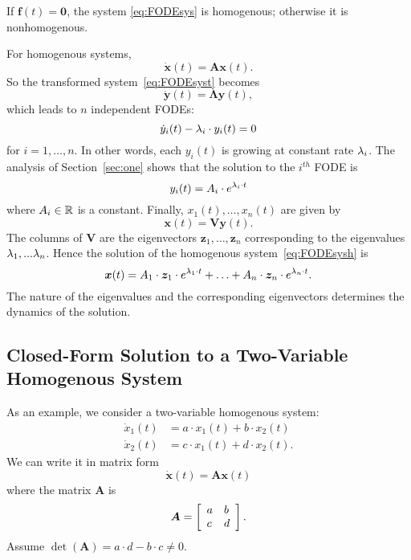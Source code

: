 \documentclass[letterpaper,12pt,leqno]{article}
\begin{document}
If $\bm{f}(t) =\bm{0}$, the system \eqref{eq:FODEsys} is homogenous; otherwise it is nonhomogenous. 

For homogenous systems, 
\begin{equation}
\bm{\dot{x}}(t) =\bm{A} \bm{x}(t).\label{eq:FODEsysh}
\end{equation}
So the transformed system~\eqref{eq:FODEsyst} becomes 
\begin{equation*}
\bm{\dot{y}}(t) =\bm{\Lambda}\bm{y}(t) ,
\end{equation*}
which leads to $n$ independent FODEs:
\begin{equation*}
\dot{y}_{i}(t) -\lambda_{i} \cdot y_{i}(t)=0
\end{equation*}
for $i=1,\ldots,n$. In other words, each $y_{i}(t) $ is growing at constant rate $\lambda_{i}$. The analysis of Section~\ref{sec:one} shows that the solution to the $i^{th}$ FODE is 
\begin{equation*}
y_{i}(t) =A_{i}\cdot e^{\lambda_{i}\cdot t}
\end{equation*}
where $A_{i}\in \mathbb{R}$ is a constant. Finally, $x_{1}(t),\ldots,x_{n}(t)$ are given by
\begin{equation*}
\bm{x}(t) =\bm{V} \bm{y}(t) .
\end{equation*}
The columns of $\bm{V}$ are the eigenvectors $\bm{z}_{1},\ldots,\bm{z}_{n}$ corresponding to the
eigenvalues $\lambda_{1},...\lambda_{n}$. Hence the solution of the homogenous system~\eqref{eq:FODEsysh} is 
\begin{equation}
\bm{x}(t) =A_{1}\cdot \bm{z}_{1} \cdot e^{\lambda_{1}\cdot t}+\ldots+A_{n}\cdot \bm{z}_{n}\cdot e^{\lambda_{n}\cdot t}.\label{eq:SOLEV}
\end{equation}
The nature of the eigenvalues and the corresponding eigenvectors determines
the dynamics of the solution. 

\subsection{Closed-Form Solution to a Two-Variable Homogenous System}

As an example, we consider a two-variable homogenous system:
\begin{align*}
\dot{x}_{1}(t) &=a\cdot x_{1}(t)+b\cdot x_{2}(t) \\
\dot{x}_{2}(t) &=c\cdot x_{1}(t)+d\cdot x_{2}(t).
\end{align*}
We can write it in matrix form
\begin{equation*}
\bm{\dot{x}}(t) =\bm{A} \bm{x}(t)
\end{equation*}
where the matrix $\bm{A}$ is 
\begin{equation*}
\bm{A}=\left[ 
\begin{array}{ll}
a & b \\ 
c & d
\end{array} \right].
\end{equation*}
Assume $\det(\bm{A}) =a\cdot d-b\cdot c\neq 0. $
\end{document}
